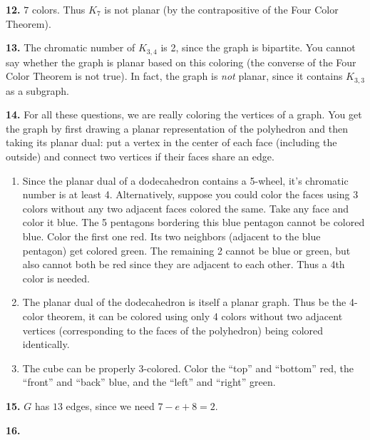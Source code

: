 \documentclass[10pt,]{book}
\theoremstyle{plain}
\theoremstyle{definition}
\theoremstyle{definition}
\theoremstyle{definition}
\numberwithin{equation}{chapter}
\begin{document}
\par\smallskip
\noindent\textbf{12.}\quad{}
            \(7\) colors. Thus \(K_7\) is not planar (by the contrapositive of the Four Color Theorem).
\par\smallskip
\noindent\textbf{13.}\quad{}
            The chromatic number of \(K_{3,4}\) is 2, since the graph is bipartite. You cannot say whether the graph is planar based on this coloring (the converse of the Four Color Theorem is not true). In fact, the graph is \emph{not} planar, since it contains \(K_{3,3}\) as a subgraph.
\par\smallskip
\noindent\textbf{14.}\quad{}
            For all these questions, we are really coloring the vertices of a graph. You get the graph by first drawing a planar representation of the polyhedron and then taking its planar dual: put a vertex in the center of each face (including the outside) and connect two vertices if their faces share an edge.
\leavevmode%
\begin{enumerate}[label=(\alph*)]
\item\hypertarget{li-1262}{}
                Since the planar dual of a dodecahedron contains a 5-wheel, it's chromatic number is at least 4. Alternatively, suppose you could color the faces using 3 colors without any two adjacent faces colored the same. Take any face and color it blue. The 5 pentagons bordering this blue pentagon cannot be colored blue. Color the first one red. Its two neighbors (adjacent to the blue pentagon) get colored green. The remaining 2 cannot be blue or green, but also cannot both be red since they are adjacent to each other. Thus a 4th color is needed.
\item\hypertarget{li-1263}{}
                The planar dual of the dodecahedron is itself a planar graph. Thus be the 4-color theorem, it can be colored using only 4 colors without two adjacent vertices (corresponding to the faces of the polyhedron) being colored identically.
\item\hypertarget{li-1264}{}
                The cube can be properly 3-colored. Color the ``top'' and ``bottom'' red, the ``front'' and ``back'' blue, and the ``left'' and ``right'' green.
\end{enumerate}
\par\smallskip
\noindent\textbf{15.}\quad{}
            \(G\) has \(13\) edges, since we need \(7 - e + 8 = 2\).
\par\smallskip
\noindent\textbf{16.}\quad{}\leavevmode%
\end{document}
